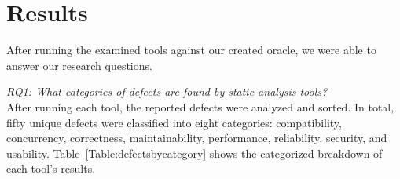\documentclass{sig-alternate}
\begin{document}
\section{Results}
\label{sec:results}

After running the examined tools against our created oracle, we were able to answer our research questions.

\noindent
\emph{RQ1: What categories of defects are found by static analysis tools?}\\
 After running each tool, the reported defects were analyzed and sorted. In total, fifty unique defects were classified into eight categories: compatibility, concurrency, correctness, maintainability, performance, reliability, security, and usability. Table~\ref{Table:defectsbycategory} shows the categorized breakdown of each tool's results.



%
%
%	
\end{document}
